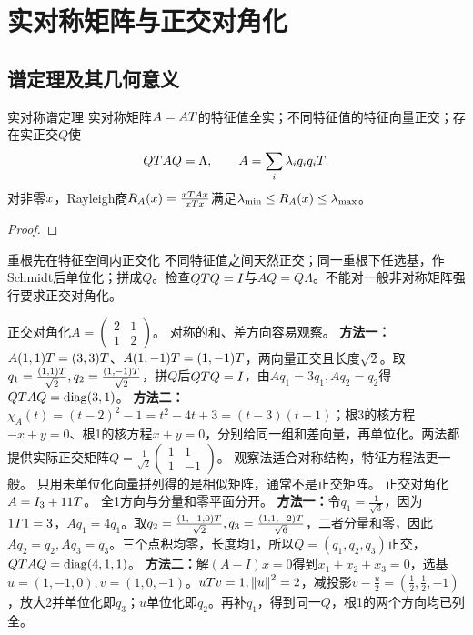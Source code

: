 \section{实对称矩阵与正交对角化}
\subsection{谱定理及其几何意义}
\begin{theorem}{实对称谱定理}
实对称矩阵$A=AT$的特征值全实；不同特征值的特征向量正交；存在实正交$Q$使
\begin{equation}QT AQ=\Lambda,\qquad A=\sum_i\lambda_iq_iq_iT.\label{eq:spectral}\end{equation}
对非零$x$，Rayleigh商$R_A(x)=\frac{xT Ax}{xTx}$满足$\lambda_{\min}\le R_A(x)\le\lambda_{\max}$。
\end{theorem}
\begin{proof}

\end{proof}
\begin{method}{重根先在特征空间内正交化}
不同特征值之间天然正交；同一重根下任选基，作Schmidt后单位化；拼成$Q$。检查$QT Q=I$与$AQ=Q\Lambda$。不能对一般非对称矩阵强行要求正交对角化。
\end{method}
{正交对角化$A=\begin{pmatrix}2&1\\1&2\end{pmatrix}$。}
{对称的和、差方向容易观察。}
{\textbf{方法一：}$A(1,1)T=(3,3)T$、$A(1,-1)T=(1,-1)T$，两向量正交且长度$\sqrt2$。取$q_1=\frac{(1,1)T}{\sqrt2},q_2=\frac{(1,-1)T}{\sqrt2}$，拼$Q$后$QT Q=I$，由$Aq_1=3q_1,Aq_2=q_2$得$QT AQ=\operatorname{diag}(3,1)$。
\textbf{方法二：}$\chi_A(t)=(t-2)^2-1=t^2-4t+3=(t-3)(t-1)$；根3的核方程$-x+y=0$、根1的核方程$x+y=0$，分别给同一组和差向量，再单位化。两法都提供实际正交矩阵$Q=\frac1{\sqrt2}\begin{pmatrix}1&1\\1&-1\end{pmatrix}$。}
{观察法适合对称结构，特征方程法更一般。}
{只用未单位化向量拼列得的是相似矩阵，通常不是正交矩阵。}
{正交对角化$A=I_3+11T$。}
{全1方向与分量和零平面分开。}
{\textbf{方法一：}令$q_1=\frac{\bm1}{\sqrt3}$，因为$1T1=3$，$Aq_1=4q_1$。取$q_2=\frac{(1,-1,0)T}{\sqrt2},q_3=\frac{(1,1,-2)T}{\sqrt6}$，二者分量和零，因此$Aq_2=q_2,Aq_3=q_3$。三个点积均零，长度均1，所以$Q=(q_1,q_2,q_3)$正交，$QT AQ=\operatorname{diag}(4,1,1)$。
\textbf{方法二：}解$(A-I)x=0$得到$x_1+x_2+x_3=0$，选基$u=(1,-1,0),v=(1,0,-1)$。$uT v=1,\left\lVert u\right\rVert^2=2$，减投影$v-\frac{u}{2}=(\frac{1}{2},\frac{1}{2},-1)$，放大2并单位化即$q_3$；$u$单位化即$q_2$。再补$q_1$，得到同一$Q$，根1的两个方向均已列全。}
